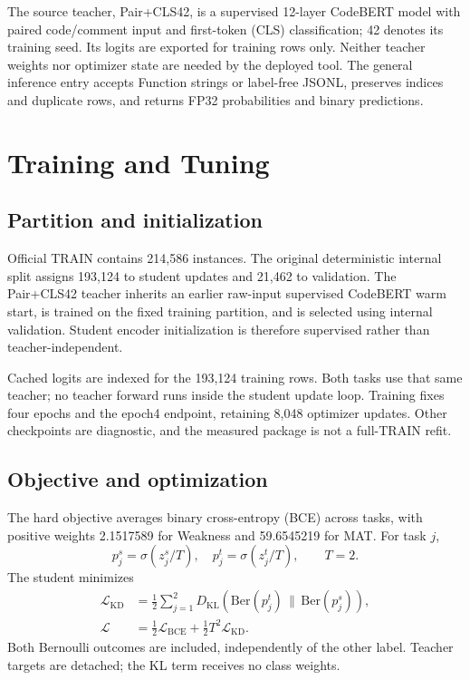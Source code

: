 \documentclass[10pt,conference]{IEEEtran}
\begin{document}
The source teacher, Pair+CLS42, is a supervised 12-layer CodeBERT model with paired code/comment input and first-token (CLS) classification; 42 denotes its training seed. Its logits are exported for training rows only. Neither teacher weights nor optimizer state are needed by the deployed tool. The general inference entry accepts Function strings or label-free JSONL, preserves indices and duplicate rows, and returns FP32 probabilities and binary predictions.

\section{Training and Tuning}
\subsection{Partition and initialization}
Official TRAIN contains 214,586 instances. The original deterministic internal split assigns 193,124 to student updates and 21,462 to validation. The Pair+CLS42 teacher inherits an earlier raw-input supervised CodeBERT warm start, is trained on the fixed training partition, and is selected using internal validation. Student encoder initialization is therefore supervised rather than teacher-independent.

Cached logits are indexed for the 193,124 training rows. Both tasks use that same teacher; no teacher forward runs inside the student update loop. Training fixes four epochs and the epoch4 endpoint, retaining 8,048 optimizer updates. Other checkpoints are diagnostic, and the measured package is not a full-TRAIN refit.

\subsection{Objective and optimization}
The hard objective averages binary cross-entropy (BCE) across tasks, with positive weights 2.1517589 for Weakness and 59.6545219 for MAT. For task $j$,
\[
 p^s_j=\sigma(z^s_j/T),\quad p^t_j=\sigma(z^t_j/T),\qquad T=2.
\]
The student minimizes
\begin{align}
 \mathcal{L}_{\mathrm{KD}}&=\tfrac12\sum_{j=1}^{2}
 D_{\mathrm{KL}}\!\left(\mathrm{Ber}(p^t_j)\,\|\,\mathrm{Ber}(p^s_j)\right),\\
 \mathcal{L}&=\tfrac12\mathcal{L}_{\mathrm{BCE}}+
             \tfrac12T^2\mathcal{L}_{\mathrm{KD}}.
\end{align}
Both Bernoulli outcomes are included, independently of the other label. Teacher targets are detached; the KL term receives no class weights.
\end{document}
